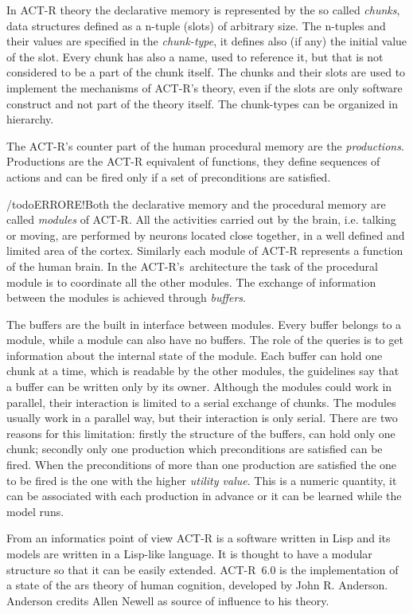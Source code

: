 In \mbox{ACT-R} theory the declarative memory is represented by the so called \emph{chunks}, data structures defined as a n-tuple (slots) of arbitrary size. The n-tuples and their values are specified in the \emph{chunk-type}, it defines also (if any) the initial value of the slot. Every chunk has also a name, used to reference it, but that is not considered to be a part of the chunk itself. The chunks and their slots are used to implement the mechanisms of \mbox{ACT-R's} theory, even if the slots are only software construct and not part of the theory itself. The chunk-types can be organized in hierarchy.

The \mbox{ACT-R's} counter part of the human procedural memory are the \emph{productions}. Productions are the \mbox{ACT-R} equivalent of functions, they define sequences of actions and can be fired only if a set of preconditions are satisfied. 

/todo{ERRORE!}Both the declarative memory and the procedural memory are called \emph{modules} of \mbox{ACT-R}. All the activities carried out by the brain, i.e. talking or moving, are performed by neurons located close together, in a well defined and limited area of the cortex. Similarly each module of \mbox{ACT-R} represents a function of the human brain. In the \mbox{ACT-R's architecture} the task of the procedural module is to coordinate all the other modules. The exchange of information between the modules is achieved through \emph{buffers}.

The buffers are the built in interface between modules. Every buffer belongs to a module, while a module can also have no buffers. The role of the queries  is to get information about the internal state of the module. Each buffer can hold one chunk at a time, which is readable by the other modules, the guidelines say that a buffer can be written only by its owner. Although the modules could work in parallel, their interaction is limited to a serial exchange of chunks. The modules usually work in a parallel way, but their interaction is only serial. There are two reasons for this limitation: firstly the structure of the buffers, can hold only one chunk; secondly only one production which preconditions are satisfied can be fired. When the preconditions of more than one production are satisfied the one to be fired is the one with the higher \emph{utility value}. This is a numeric quantity, it can be associated with each production in advance or it can be learned while the model runs.

From an informatics point of view \mbox{ACT-R} is a software written in Lisp and its models are written in a Lisp-like language. It is thought to have a modular structure so that it can be easily extended. \mbox{ACT-R 6.0} is the implementation of a state of the ars theory of human cognition, developed by John R. Anderson. Anderson credits Allen Newell as source of influence to his theory.
